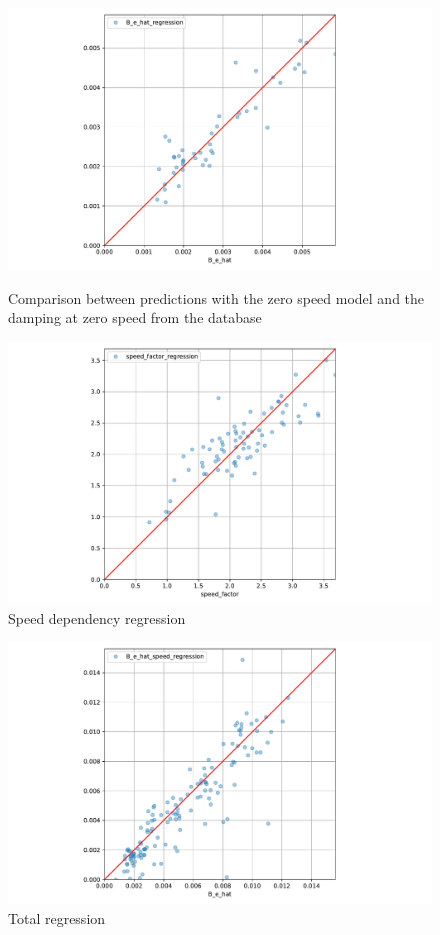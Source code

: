 \begin{figure}[H]
\centering
\begin{minipage}{.5\textwidth}
  \centering
  \includegraphics[width=\columnwidth]{figures/B_e_hat0_regression.pdf}
    \caption{Comparison between predictions with the zero speed model and the damping at zero speed from the database}
    \label{fig:B_e_hat0_regression}
\end{minipage}%
\begin{minipage}{.5\textwidth}
  \centering
 \includegraphics[width=\columnwidth]{figures/B_e_factor_regression.pdf}
    \caption{Speed dependency regression}
    \label{fig:B_e_factor_regression}
\end{minipage}
\end{figure}


\begin{figure}[H]
    \centering
    \includegraphics[width=\columnwidth]{figures/B_e_factor_regression_total.pdf}
    \caption{Total regression}
    \label{fig:B_e_factor_regression_total}
\end{figure}

